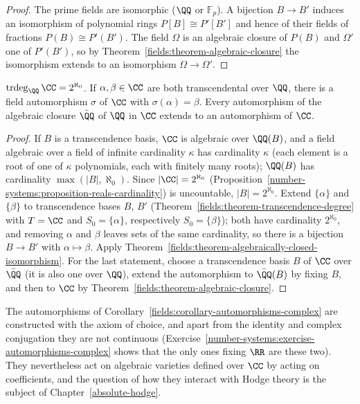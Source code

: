 \begin{proof}
The prime fields are isomorphic ($\QQ$ or $\mathbb{F}_p$). A bijection $B \to B'$ induces an isomorphism
of polynomial rings $P[B] \cong P'[B']$ and hence of their fields of fractions
$P(B) \cong P'(B')$. The field $\Omega$ is an algebraic closure of $P(B)$ and $\Omega'$ one of $P'(B')$, so
by Theorem~\ref{fields:theorem-algebraic-closure} the isomorphism extends to an isomorphism
$\Omega \to \Omega'$.
\end{proof}

\begin{corollary}\label{fields:corollary-automorphisms-complex}
$\operatorname{trdeg}_\QQ \CC = 2^{\aleph_0}$. If $\alpha, \beta \in \CC$ are both transcendental over $\QQ$, there is a
field automorphism $\sigma$ of $\CC$ with $\sigma(\alpha) = \beta$. Every automorphism of the algebraic
closure $\bar{\QQ}$ of $\QQ$ in $\CC$ extends to an automorphism of $\CC$.
\end{corollary}

\begin{proof}
If $B$ is a transcendence basis, $\CC$ is algebraic over $\QQ(B)$, and a field algebraic over a field
of infinite cardinality $\kappa$ has cardinality $\kappa$ (each element is a root of one of
$\kappa$ polynomials, each with finitely many roots); $\QQ(B)$ has cardinality
$\max(|B|, \aleph_0)$. Since $|\CC| = 2^{\aleph_0}$ (Proposition~\ref{number-systems:proposition-reals-cardinality})
is uncountable, $|B| = 2^{\aleph_0}$. Extend $\{\alpha\}$ and $\{\beta\}$ to transcendence bases $B$, $B'$
(Theorem~\ref{fields:theorem-transcendence-degree} with $T = \CC$ and $S_0 = \{\alpha\}$, respectively
$S_0 = \{\beta\}$); both have cardinality
$2^{\aleph_0}$, and removing $\alpha$ and $\beta$ leaves sets of the same cardinality, so there is a
bijection $B \to B'$ with $\alpha \mapsto \beta$. Apply
Theorem~\ref{fields:theorem-algebraically-closed-isomorphism}. For the last statement, choose a
transcendence basis $B$ of $\CC$ over $\bar{\QQ}$ (it is also one over $\QQ$), extend the automorphism
to $\bar{\QQ}(B)$ by fixing $B$, and then to $\CC$ by Theorem~\ref{fields:theorem-algebraic-closure}.
\end{proof}

\begin{remark}\label{fields:remark-wild-automorphisms}
The automorphisms of Corollary~\ref{fields:corollary-automorphisms-complex} are constructed with
the axiom of choice, and apart from the identity and complex conjugation they are not
continuous (Exercise~\ref{number-systems:exercise-automorphisms-complex} shows that the only ones
fixing $\RR$ are these two). They nevertheless act on algebraic varieties defined over $\CC$ by
acting on coefficients, and the question of how they interact with Hodge theory is the subject
of Chapter~\ref{absolute-hodge}.
\end{remark}

